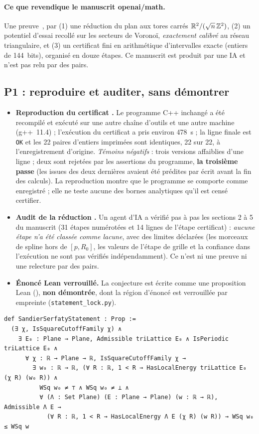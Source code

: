 \paragraph{Ce que revendique le manuscrit openai/math.} Une preuve~\cite{ch2oaiss}, par (1) une réduction du plan aux
tores carrés $\mathbb{R}^2/(\sqrt n\,\mathbb{Z}^2)$, (2) un potentiel d'essai recollé sur les secteurs de Voronoï, \emph{exactement
calibré} au réseau triangulaire, et (3) un certificat fini en arithmétique d'intervalles exacte (entiers de 144~bits),
organisé en douze étapes. Ce manuscrit est produit par une IA et n'est pas relu par des pairs.

\subsection{P1 : reproduire et auditer, sans démontrer}\label{ch2:ssec:p1}
\begin{itemize}
\item \textbf{Reproduction du certificat \tierX.} Le programme C++ inchangé a été recompilé et exécuté sur une autre
chaîne d'outils et une autre machine (g++~11.4) ; l'exécution du certificat a pris environ 478~s ; la ligne finale est
\texttt{OK} et les 22 paires d'entiers imprimées sont identiques, 22 sur 22, à l'enregistrement d'origine.
\emph{Témoins négatifs} : trois versions affaiblies d'une ligne ; deux sont rejetées par les assertions du programme,
\textbf{la troisième passe} (les issues des deux dernières avaient été prédites par écrit avant la fin des calculs). La
reproduction montre que le programme se comporte comme enregistré ; elle ne teste aucune des bornes analytiques qu'il
est censé certifier.
\item \textbf{Audit de la réduction \tierC.} Un agent d'IA a vérifié pas à pas les sections 2 à 5 du manuscrit
(31 étapes numérotées et 14 lignes de l'étape certificat) : \emph{aucune étape n'a été classée comme lacune}, avec des
limites déclarées (les morceaux de spline hors de $[p,R_0]$, les valeurs de l'étape de grille et la confiance dans
l'exécution ne sont pas vérifiés indépendamment). Ce n'est ni une preuve ni une relecture par des pairs.
\item \textbf{Énoncé Lean verrouillé.} La conjecture est écrite comme une proposition Lean (),
\textbf{non démontrée}, dont la région d'énoncé est verrouillée par empreinte (\texttt{statement\_lock.py}).
\end{itemize}
\begin{leanbox}
\begin{lstlisting}[style=chdeux]
def SandierSerfatyStatement : Prop :=
  (∃ χ, IsSquareCutoffFamily χ) ∧
    ∃ E₀ : Plane → Plane, Admissible triLattice E₀ ∧ IsPeriodic triLattice E₀ ∧
      ∀ χ : ℝ → Plane → ℝ, IsSquareCutoffFamily χ →
        ∃ w₀ : ℝ → ℝ, (∀ R : ℝ, 1 < R → HasLocalEnergy triLattice E₀ (χ R) (w₀ R)) ∧
          WSq w₀ ≠ ⊤ ∧ WSq w₀ ≠ ⊥ ∧
          ∀ (Λ : Set Plane) (E : Plane → Plane) (w : ℝ → ℝ), Admissible Λ E →
            (∀ R : ℝ, 1 < R → HasLocalEnergy Λ E (χ R) (w R)) → WSq w₀ ≤ WSq w
\end{lstlisting}
\end{leanbox}
